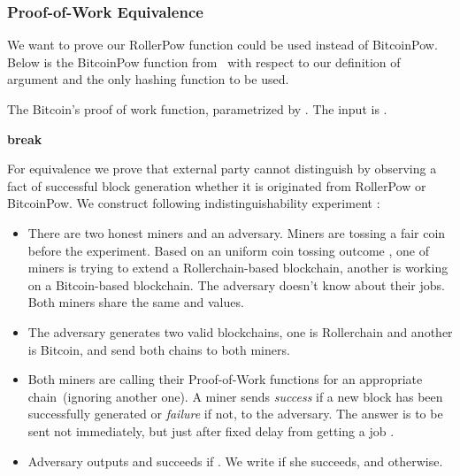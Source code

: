 \documentclass[conference,compsoc]{IEEEtran}
\begin{document}
\subsubsection{Proof-of-Work Equivalence}

We want to prove our RollerPow function could be used instead of BitcoinPow. Below is the BitcoinPow function from~\cite{garay2015bitcoin} with respect to our definition of  argument and the only hashing function  to be used.

\begin{algorithm}[H]
\caption{The Bitcoin's proof of work function, parametrized by . The input is .}
\label{algo_bitcoin_pow}
\begin{algorithmic}[1]
\State 
\If{}
	\State 
\Else
	\State 
	\State 
\EndIf
\State 
\State 
\State 

\While{}
\If{}
\State 
\State \textbf{break}
\EndIf
\State 
\EndWhile
\State 
\State \Return 
\EndFunction
\end{algorithmic}
\end{algorithm}
	
 For equivalence we prove that external party cannot distinguish by observing a fact of successful block generation whether it is originated from RollerPow or BitcoinPow. We construct following indistinguishability experiment :


\begin{itemize}
\item There are two honest miners and an adversary. Miners are tossing a fair coin before the experiment. Based on an uniform coin tossing outcome , one of miners is trying to extend a Rollerchain-based blockchain, another is working on a Bitcoin-based blockchain. The adversary doesn't know about their jobs. Both miners share the same  and  values.
\item The adversary  generates two valid blockchains, one is Rollerchain and another is Bitcoin, and send both chains to both miners.
\item Both miners are calling their Proof-of-Work functions for an appropriate chain~(ignoring another one). A miner sends \textit{success} if a new block has been successfully generated or \textit{failure} if not, to the adversary. The answer is to be sent not immediately, but just after fixed delay from getting a job .
\item Adversary outputs  and succeeds if . We write  if she succeeds, and  otherwise.
\end{itemize}
\end{document}
